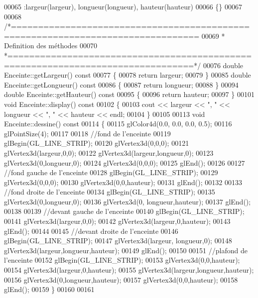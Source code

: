 \begin{DoxyCode}
00065 :largeur(largeur), longueur(longueur), hauteur(hauteur) 
00066 \{\}
00067 
00068 \textcolor{comment}{/*================================================================================}
00069 \textcolor{comment}{ * Definition des méthodes}
00070 \textcolor{comment}{ *================================================================================*/}
00076 \textcolor{keywordtype}{double} Enceinte::getLargeur()\textcolor{keyword}{ const}
00077 \textcolor{keyword}{}\{
00078     \textcolor{keywordflow}{return} largeur;
00079 \}
00085 \textcolor{keywordtype}{double} Enceinte::getLongueur()\textcolor{keyword}{ const}
00086 \textcolor{keyword}{}\{
00087     \textcolor{keywordflow}{return} longueur;
00088 \}
00094 \textcolor{keywordtype}{double} Enceinte::getHauteur()\textcolor{keyword}{ const}
00095 \textcolor{keyword}{}\{
00096     \textcolor{keywordflow}{return} hauteur;
00097 \}
00101 \textcolor{keywordtype}{void} Enceinte::display()\textcolor{keyword}{ const}
00102 \textcolor{keyword}{}\{
00103     cout << largeur << \textcolor{stringliteral}{", "} << longueur << \textcolor{stringliteral}{", "} << hauteur << endl;
00104 \}
00105 
00113 \textcolor{keywordtype}{void} Enceinte::dessine()\textcolor{keyword}{ const}
00114 \textcolor{keyword}{}\{
00115     glColor4d(0.0, 0.0, 0.0, 0.5);
00116     glPointSize(4);
00117     
00118     \textcolor{comment}{//fond de l'enceinte}
00119     glBegin(GL\_LINE\_STRIP);
00120     glVertex3d(0,0,0);
00121     glVertex3d(largeur,0,0);
00122     glVertex3d(largeur,longueur,0);
00123     glVertex3d(0,longueur,0);
00124     glVertex3d(0,0,0);
00125     glEnd();
00126     
00127     \textcolor{comment}{//fond gauche de l'enceinte}
00128     glBegin(GL\_LINE\_STRIP);
00129     glVertex3d(0,0,0);
00130     glVertex3d(0,0,hauteur);
00131     glEnd();
00132     
00133     \textcolor{comment}{//fond droite de l'enceinte}
00134     glBegin(GL\_LINE\_STRIP);
00135     glVertex3d(0,longueur,0);
00136     glVertex3d(0, longueur,hauteur);
00137     glEnd();
00138     
00139     \textcolor{comment}{//devant gauche de l'enceinte}
00140     glBegin(GL\_LINE\_STRIP);
00141     glVertex3d(largeur,0,0);
00142     glVertex3d(largeur,0,hauteur);
00143     glEnd();
00144     
00145     \textcolor{comment}{//devant droite de l'enceinte}
00146     glBegin(GL\_LINE\_STRIP);
00147     glVertex3d(largeur, longueur,0);
00148     glVertex3d(largeur,longueur,hauteur);
00149     glEnd();
00150     
00151     \textcolor{comment}{//plafond  de l'enceinte}
00152     glBegin(GL\_LINE\_STRIP);
00153     glVertex3d(0,0,hauteur);
00154     glVertex3d(largeur,0,hauteur);
00155     glVertex3d(largeur,longueur,hauteur);
00156     glVertex3d(0,longueur,hauteur);
00157     glVertex3d(0,0,hauteur);
00158     glEnd();
00159 \}
00160 
00161 
\end{DoxyCode}
